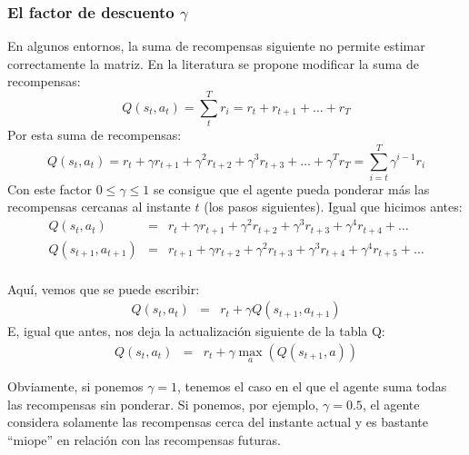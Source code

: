 \documentclass{article}
\begin{document}
\begin{itemize}
\subsubsection{El factor de descuento $\gamma$}
En algunos entornos, la suma de recompensas siguiente no permite estimar correctamente la matriz. En la literatura se propone modificar la suma de recompensas:
\begin{equation}
Q(s_t,a_t) = \sum_t^{T} r_i= r_t +  r_{t+1}+ \ldots + r_T
\end{equation}
Por esta suma de recompensas:
\begin{equation}
Q(s_t,a_t) = r_t + \gamma r_{t+1}+ \gamma^2 r_{t+2} + \gamma^3r_{t+3} +  \ldots + \gamma^T r_T = \sum_{i=t}^{T} \gamma^{i-1}r_i
\end{equation}
Con este factor $0\leq\gamma\leq1$ se consigue que el agente pueda ponderar más las recompensas cercanas al instante $t$ (los pasos siguientes). Igual que hicimos antes:
\begin{eqnarray*}
Q(s_t,a_t) &=& r_t + \gamma r_{t+1}+ \gamma^2 r_{t+2} + \gamma^3r_{t+3} + \gamma^4r_{t+4} +  \ldots \\
Q(s_{t+1},a_{t+1}) &=& r_{t+1} + \gamma r_{t+2}+ \gamma^2 r_{t+3} + \gamma^3r_{t+4} + \gamma^4r_{t+5} +  \ldots \\
\end{eqnarray*}

Aquí, vemos que se puede escribir:
\begin{eqnarray*}
Q(s_t,a_t) &=& r_t + \gamma 
Q(s_{t+1},a_{t+1}) 
\end{eqnarray*}
E, igual que antes, nos deja la actualización siguiente de la tabla Q:
\begin{eqnarray*}
Q(s_t,a_t) &=& r_t + \gamma 
\max_a(Q(s_{t+1},a))
\end{eqnarray*}

Obviamente, si ponemos $\gamma=1$, tenemos el caso en el que el agente suma todas las recompensas sin ponderar. Si ponemos, por ejemplo, $\gamma=0.5$, el agente considera solamente las recompensas cerca del instante actual y es bastante ``miope'' en relación con las recompensas futuras.


\end{itemize}
\end{document}
